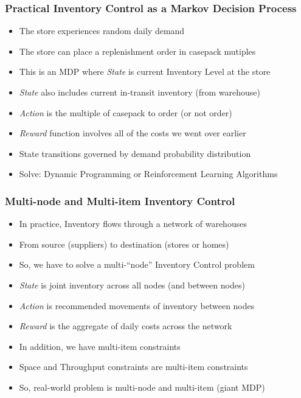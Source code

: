 \documentclass[handout]{beamer}
\begin{document}
\begin{frame}
\frametitle{Practical Inventory Control as a Markov Decision Process}
\pause
\begin{itemize}[<+->]
\item The store experiences random daily demand
\item The store can place a replenishment order in casepack mutiples
\item This is an MDP where {\em State} is current Inventory Level at the store
\item {\em State} also includes current in-transit inventory (from warehouse)
\item {\em Action} is the multiple of casepack to order (or not order)
\item {\em Reward} function involves all of the costs we went over earlier
\item State transitions governed by demand probability distribution
\item Solve: Dynamic Programming or Reinforcement Learning Algorithms
\end{itemize}
\end{frame}



\begin{frame}
\frametitle{Multi-node and Multi-item Inventory Control}
\pause
\begin{itemize}[<+->]
\item In practice, Inventory flows through a network of warehouses
\item From source (suppliers) to destination (stores or homes)
\item So, we have to solve a multi-``node'' Inventory Control problem
\item {\em State} is joint inventory across all nodes (and between nodes)
\item {\em Action} is recommended movements of inventory between nodes
\item {\em Reward} is the aggregate of daily costs across the network
\item In addition, we have multi-item constraints
\item Space and Throughput constraints are multi-item constraints
\item So, real-world problem is multi-node and multi-item (giant MDP)
\end{itemize}
\end{frame}
\end{document}
